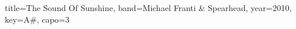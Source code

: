 \documentclass{skrul-leadsheet}
\begin{document}
\begin{song}[transpose-capo=true]{title={The Sound Of Sunshine}, band={Michael Franti \& Spearhead}, year={2010}, key={A#}, capo={3}}



\end{song}
\end{document}
